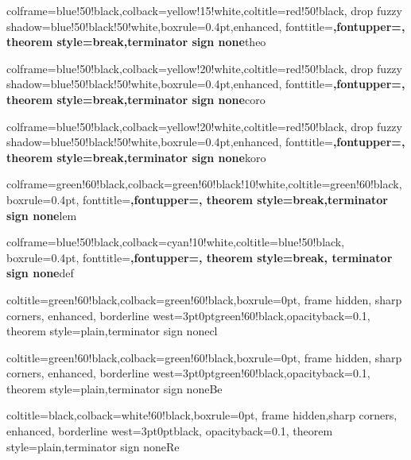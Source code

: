 \usepackage{tcolorbox}

%  
{colframe=blue!50!black,colback=yellow!15!white,coltitle=red!50!black,
drop fuzzy shadow=blue!50!black!50!white,boxrule=0.4pt,enhanced,
fonttitle=\upshape\bfseries,fontupper=\upshape,
theorem style=break,terminator sign none}{theo}

%
{colframe=blue!50!black,colback=yellow!20!white,coltitle=red!50!black,
drop fuzzy shadow=blue!50!black!50!white,boxrule=0.4pt,enhanced,
fonttitle=\upshape\bfseries,fontupper=\upshape,
theorem style=break,terminator sign none}{coro}

%
{colframe=blue!50!black,colback=yellow!20!white,coltitle=red!50!black,
drop fuzzy shadow=blue!50!black!50!white,boxrule=0.4pt,enhanced,
fonttitle=\upshape\bfseries,fontupper=\upshape,
theorem style=break,terminator sign none}{koro}

%
{colframe=green!60!black,colback=green!60!black!10!white,coltitle=green!60!black,
boxrule=0.4pt,
fonttitle=\upshape\bfseries,fontupper=\upshape,
theorem style=break,terminator sign none}{lem}

%
{colframe=blue!50!black,colback=cyan!10!white,coltitle=blue!50!black,
boxrule=0.4pt,
fonttitle=\upshape\bfseries,fontupper=\upshape,
theorem style=break, terminator sign none}{def}

%
{coltitle=green!60!black,colback=green!60!black,boxrule=0pt,
frame hidden, sharp corners, enhanced,
borderline west={3pt}{0pt}{green!60!black},opacityback=0.1,
theorem style=plain,terminator sign none}{cl}

%
{coltitle=green!60!black,colback=green!60!black,boxrule=0pt,
frame hidden, sharp corners, enhanced,
borderline west={3pt}{0pt}{green!60!black},opacityback=0.1,
theorem style=plain,terminator sign none}{Be}

%
{coltitle=black,colback=white!60!black,boxrule=0pt,
frame hidden,sharp corners, enhanced,
borderline west={3pt}{0pt}{black},
opacityback=0.1,
theorem style=plain,terminator sign none}{Re}

\newcommand{\N}{\mathbb{N}}
\newcommand{\Z}{\mathbb{Z}}
\newcommand{\Q}{\mathbb{Q}}
\newcommand{\R}{\mathbb{R}}
\newcommand{\C}{\mathbb{C}}
